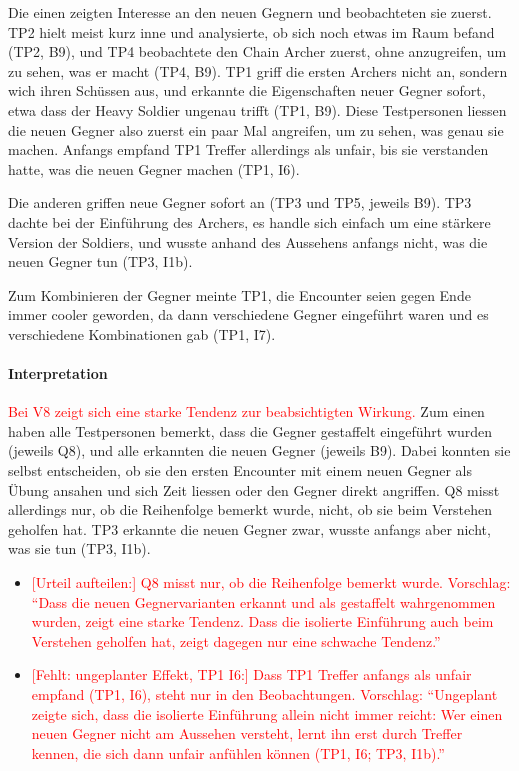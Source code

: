 \documentclass[../Main.tex]{subfiles}
\begin{document}
Die einen zeigten Interesse an den neuen Gegnern und beobachteten sie zuerst. TP2 hielt meist kurz inne und analysierte, ob sich noch etwas im Raum befand (TP2, B9), und TP4 beobachtete den Chain Archer zuerst, ohne anzugreifen, um zu sehen, was er macht (TP4, B9). TP1 griff die ersten Archers nicht an, sondern wich ihren Schüssen aus, und erkannte die Eigenschaften neuer Gegner sofort, etwa dass der Heavy Soldier ungenau trifft (TP1, B9). Diese Testpersonen liessen die neuen Gegner also zuerst ein paar Mal angreifen, um zu sehen, was genau sie machen. Anfangs empfand TP1 Treffer allerdings als unfair, bis sie verstanden hatte, was die neuen Gegner machen (TP1, I6).

Die anderen griffen neue Gegner sofort an (TP3 und TP5, jeweils B9). TP3 dachte bei der Einführung des Archers, es handle sich einfach um eine stärkere Version der Soldiers, und wusste anhand des Aussehens anfangs nicht, was die neuen Gegner tun (TP3, I1b).

Zum Kombinieren der Gegner meinte TP1, die Encounter seien gegen Ende immer cooler geworden, da dann verschiedene Gegner eingeführt waren und es verschiedene Kombinationen gab (TP1, I7).

\paragraph{Interpretation}
\textcolor{red}{Bei V8 zeigt sich eine starke Tendenz zur beabsichtigten Wirkung.} Zum einen haben alle Testpersonen bemerkt, dass die Gegner gestaffelt eingeführt wurden (jeweils Q8), und alle erkannten die neuen Gegner (jeweils B9). Dabei konnten sie selbst entscheiden, ob sie den ersten Encounter mit einem neuen Gegner als Übung ansahen und sich Zeit liessen oder den Gegner direkt angriffen. Q8 misst allerdings nur, ob die Reihenfolge bemerkt wurde, nicht, ob sie beim Verstehen geholfen hat. TP3 erkannte die neuen Gegner zwar, wusste anfangs aber nicht, was sie tun (TP3, I1b).

\begin{itemize}[leftmargin=1.5cm]
    \item \textcolor{red}{[Urteil aufteilen:] Q8 misst nur, ob die Reihenfolge bemerkt wurde. Vorschlag: \enquote{Dass die neuen Gegnervarianten erkannt und als gestaffelt wahrgenommen wurden, zeigt eine starke Tendenz. Dass die isolierte Einführung auch beim Verstehen geholfen hat, zeigt dagegen nur eine schwache Tendenz.}}
    \item \textcolor{red}{[Fehlt: ungeplanter Effekt, TP1 I6:] Dass TP1 Treffer anfangs als unfair empfand (TP1, I6), steht nur in den Beobachtungen. Vorschlag: \enquote{Ungeplant zeigte sich, dass die isolierte Einführung allein nicht immer reicht: Wer einen neuen Gegner nicht am Aussehen versteht, lernt ihn erst durch Treffer kennen, die sich dann unfair anfühlen können (TP1, I6; TP3, I1b).}}
\end{itemize}
\end{document}
